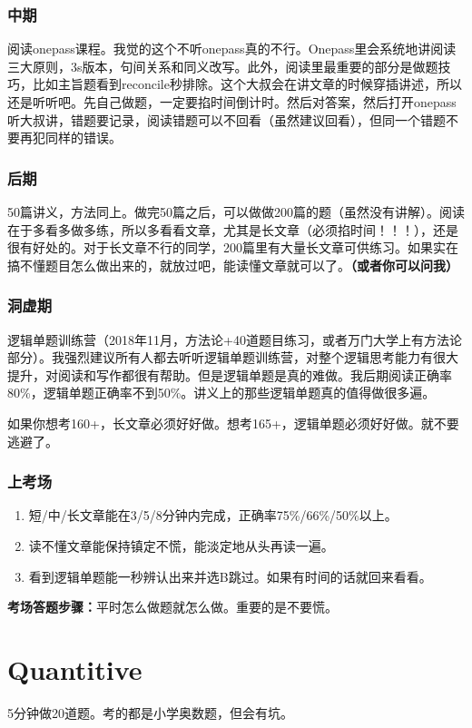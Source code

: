 \documentclass[cn,plain]{elegantbookex}
\begin{document}
\subsection{中期}
阅读onepass课程。我觉的这个不听onepass真的不行。Onepass里会系统地讲阅读三大原则，3s版本，句间关系和同义改写。此外，阅读里最重要的部分是做题技巧，比如主旨题看到reconcile秒排除。这个大叔会在讲文章的时候穿插讲述，所以还是听听吧。先自己做题，一定要掐时间倒计时。然后对答案，然后打开onepass听大叔讲，错题要记录，阅读错题可以不回看（虽然建议回看），但同一个错题不要再犯同样的错误。

\subsection{后期}
50篇讲义，方法同上。做完50篇之后，可以做做200篇的题（虽然没有讲解）。阅读在于多看多做多练，所以多看看文章，尤其是长文章（必须掐时间！！！），还是很有好处的。对于长文章不行的同学，200篇里有大量长文章可供练习。如果实在搞不懂题目怎么做出来的，就放过吧，能读懂文章就可以了。\textbf{（或者你可以问我）}

\subsection{洞虚期}
逻辑单题训练营（2018年11月，方法论+40道题目练习，或者万门大学上有方法论部分）。我强烈建议所有人都去听听逻辑单题训练营，对整个逻辑思考能力有很大提升，对阅读和写作都很有帮助。但是逻辑单题是真的难做。我后期阅读正确率80\%，逻辑单题正确率不到50\%。讲义上的那些逻辑单题真的值得做很多遍。

如果你想考160+，长文章必须好好做。想考165+，逻辑单题必须好好做。就不要逃避了。

\subsection{上考场}
\begin{enumerate}
    \item 短/中/长文章能在3/5/8分钟内完成，正确率75\%/66\%/50\%以上。
    \item 读不懂文章能保持镇定不慌，能淡定地从头再读一遍。
    \item 看到逻辑单题能一秒辨认出来并选B跳过。如果有时间的话就回来看看。
\end{enumerate}

\textbf{考场答题步骤：}平时怎么做题就怎么做。重要的是不要慌。

\chapter{Quantitive}
5分钟做20道题。考的都是小学奥数题，但会有坑。
\end{document}

